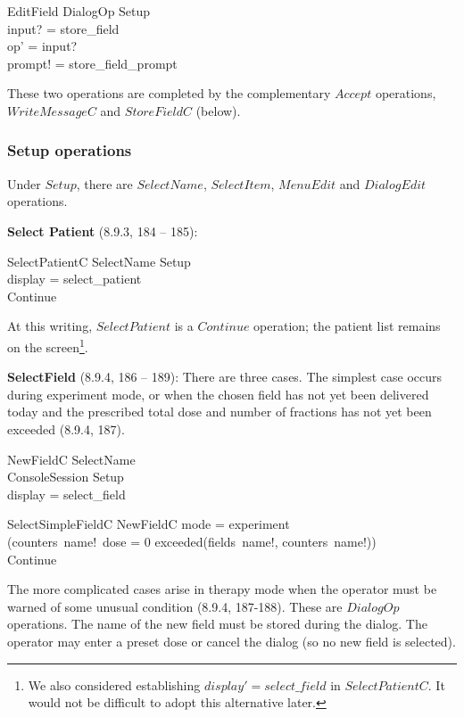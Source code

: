 \begin{schema}{EditField}
	DialogOp
\where
	Setup \\
	input? = store\_field \\
	op' = input? \\
	prompt! = store\_field\_prompt
\end{schema}
These two operations are completed by the complementary $Accept$
operations, $WriteMessageC$ and $StoreFieldC$ (below).

\subsubsection{Setup operations}

Under $Setup$, there are $SelectName$, $SelectItem$, $MenuEdit$ and
$DialogEdit$ operations.

{\bf Select Patient} (8.9.3, 184 -- 185):

\begin{schema}{SelectPatientC}
	SelectName
\where
	Setup \\
	display = select\_patient \\
	Continue
\end{schema}
At this writing, $SelectPatient$ is a $Continue$ operation; the
patient list remains on the screen\footnote{We also considered
establishing $display' = select\_field$ in $SelectPatientC$.  It would
not be difficult to adopt this alternative later.}.

{\bf SelectField} (8.9.4, 186 -- 189): There are three cases.  The
simplest case occurs during experiment mode, or when the chosen field
has not yet been delivered today and the prescribed total dose and
number of fractions has not yet been exceeded (8.9.4, 187).

\begin{schema}{NewFieldC}
	SelectName \\
	ConsoleSession
\where
	Setup \\
	display = select\_field \\
\end{schema}

\begin{schema}{SelectSimpleFieldC}
	NewFieldC
\where
	mode = experiment \\
	\lor (counters~name!~dose = 0 \land \lnot exceeded(fields~name!, counters~name!)) \\
	Continue
\end{schema}
The more complicated cases arise in therapy mode when the operator
must be warned of some unusual condition (8.9.4, 187-188).  These are
$DialogOp$ operations. The name of the new field must be stored during
the dialog.  The operator may enter a preset dose or cancel
the dialog (so no new field is selected).

